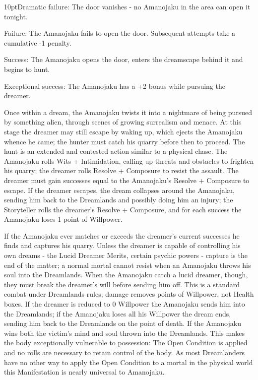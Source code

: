     \begin{myindentpar}{10pt}Dramatic failure: The door vanishes - no Amanojaku in the area can open it tonight. 
    
    Failure: The Amanojaku fails to open the door. Subsequent attempts take a cumulative -1 penalty. 
    
    Success: The Amanojaku opens the door, enters the dreamscape behind it and begins to hunt. 
    
    Exceptional success: The Amanojaku has a +2 bonus while pursuing the dreamer. \end{myindentpar}    

Once within a dream, the Amanojaku twists it into a nightmare of being pursued by something alien, through scenes of growing surrealism and menace. At this stage the dreamer may still escape by waking up, which ejects the Amanojaku whence he came; the hunter must catch his quarry before then to proceed. The hunt is an extended and contested action similar to a physical chase. The Amanojaku rolls Wits + Intimidation, calling up threats and obstacles to frighten his quarry; the dreamer rolls Resolve + Composure to resist the assault. The dreamer must gain successes equal to the Amanojaku's Resolve + Composure to escape. If the dreamer escapes, the dream collapses around the Amanojaku, sending him back to the Dreamlands and possibly doing him an injury; the Storyteller rolls the dreamer's Resolve + Composure, and for each success the Amanojaku loses 1 point of Willpower.

If the Amanojaku ever matches or exceeds the dreamer's current successes he finds and captures his quarry. Unless the dreamer is capable of controlling his own dreams - the Lucid Dreamer Merits, certain psychic powers - capture is the end of the matter; a normal mortal cannot resist when an Amanojaku throws his soul into the Dreamlands. When the Amanojaku catch a lucid dreamer, though, they must break the dreamer's will before sending him off. This is a standard combat under Dreamlands rules; damage removes points of Willpower, not Health boxes. If the dreamer is reduced to 0 Willpower the Amanojaku sends him into the Dreamlands; if the Amanojaku loses all his Willpower the dream ends, sending him back to the Dreamlands on the point of death. If the Amanojaku wins both the victim's mind and soul thrown into the Dreamlands. This makes the body exceptionally vulnerable to possession: The Open Condition is applied and no rolls are necessary to retain control of the body. As most Dreamlanders have no other way 
to apply the Open Condition to a mortal in the physical world this Manifestation is nearly universal to Amanojaku.


